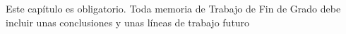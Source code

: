 Este capítulo es obligatorio. Toda memoria de Trabajo de Fin de Grado debe incluir unas conclusiones y unas líneas de trabajo futuro 